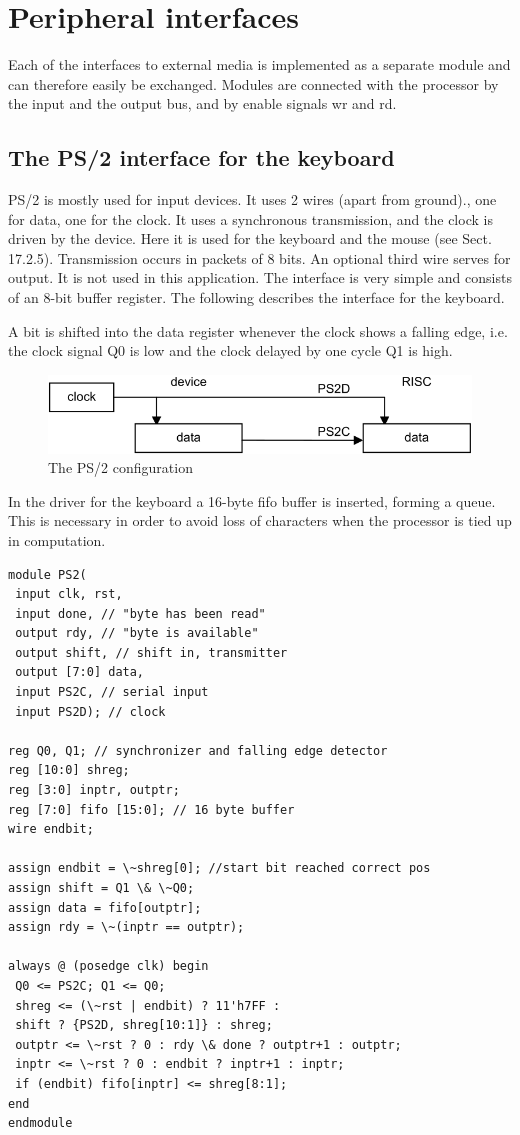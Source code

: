 \section{Peripheral interfaces}
Each of the interfaces to external media is implemented as a separate module and can therefore
easily be exchanged. Modules are connected with the processor by the input and the output bus,
and by enable signals wr and rd.

\subsection{The PS/2 interface for the keyboard}
\label{sub:ps2}
PS/2 is mostly used for input devices. It uses 2 wires (apart from ground)., one for data, one for the
clock. It uses a synchronous transmission, and the clock is driven by the device. Here it is used for
the keyboard and the mouse (see Sect. 17.2.5). Transmission occurs in packets of 8 bits. An
optional third wire serves for output. It is not used in this application. The interface is very simple
and consists of an 8-bit buffer register. The following describes the interface for the keyboard.

A bit is shifted into the data register whenever the clock shows a falling edge, i.e. the clock signal
Q0 is low and the clock delayed by one cycle Q1 is high.
\begin{figure}[h!]
  \centering
  \includegraphics[width=.9\textwidth]{i/G/3.png}
  \caption{The PS/2 configuration}
  \label{fig:ps2}
\end{figure}

In the driver for the keyboard a 16-byte fifo buffer is inserted, forming a queue. This is necessary in order to
avoid loss of characters when the processor is tied up in computation.
\begin{verbatim}
module PS2(
 input clk, rst,
 input done, // "byte has been read"
 output rdy, // "byte is available"
 output shift, // shift in, transmitter
 output [7:0] data,
 input PS2C, // serial input
 input PS2D); // clock

reg Q0, Q1; // synchronizer and falling edge detector
reg [10:0] shreg;
reg [3:0] inptr, outptr;
reg [7:0] fifo [15:0]; // 16 byte buffer
wire endbit;

assign endbit = \~shreg[0]; //start bit reached correct pos
assign shift = Q1 \& \~Q0;
assign data = fifo[outptr];
assign rdy = \~(inptr == outptr);

always @ (posedge clk) begin
 Q0 <= PS2C; Q1 <= Q0;
 shreg <= (\~rst | endbit) ? 11'h7FF :
 shift ? {PS2D, shreg[10:1]} : shreg;
 outptr <= \~rst ? 0 : rdy \& done ? outptr+1 : outptr;
 inptr <= \~rst ? 0 : endbit ? inptr+1 : inptr;
 if (endbit) fifo[inptr] <= shreg[8:1];
end
endmodule
\end{verbatim}


